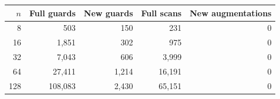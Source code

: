 \begin{tabular}{rrrrr}
\toprule
$n$ & Full guards & New guards & Full scans & New augmentations \\
\midrule
8 & 503 & 150 & 231 & 0 \\
16 & 1,851 & 302 & 975 & 0 \\
32 & 7,043 & 606 & 3,999 & 0 \\
64 & 27,411 & 1,214 & 16,191 & 0 \\
128 & 108,083 & 2,430 & 65,151 & 0 \\
\bottomrule
\end{tabular}
